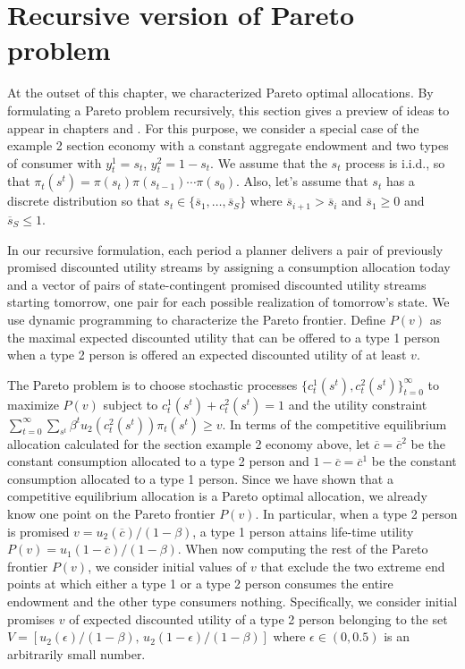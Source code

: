 \section{Recursive version of Pareto problem}\label{sec:RecursivePareto}%
At the  outset of this chapter, we characterized Pareto
optimal allocations. By formulating a Pareto problem  recursively, this section
gives a preview of ideas to appear in chapters 
and .
For this purpose, we
consider a special case of the example 2 section   
economy with a constant aggregate
endowment and two types of consumer with $y_t^1 = s_t$, $y_t^2 = 1-s_t$.
We  assume that the $s_t$ process
is i.i.d., so that $\pi_t(s^t) = \pi(s_t)
\pi(s_{t-1}) \cdots \pi(s_0)$.   Also, let's assume
that $s_t$ has a discrete distribution
so that
$s_t \in \{\overline s_1, \ldots, \overline s_S\} $
where $\overline s_{i+1} > \overline s_i$ and $\overline s_1 \geq 0$
and $\overline s_S \leq 1$.


In our recursive formulation, each period a planner
delivers a pair of previously promised discounted
utility streams by assigning a consumption
allocation today and a vector of pairs of state-contingent
promised discounted utility streams starting tomorrow,
one pair for each possible realization of tomorrow's state.
We use dynamic programming to characterize the Pareto
frontier. Define $P(v)$ as the maximal expected discounted
utility that can be offered to a type 1 person when 
a type 2 person is offered an expected discounted
utility of at least $v$. 

The Pareto problem is to choose stochastic processes $\{c_t^1(s^t), c_t^2(s^t)\}_{t=0}^\infty$ to
 maximize
$P(v)$ subject to  $c_t^1(s^t) + c_t^2(s^t) =1$ and the utility constraint
$\sum_{t=0}^\infty \sum_{s^t} \beta^t u_2(c_t^2(s^t)) \pi_t(s^t) \geq v.$
In terms of the competitive equilibrium
allocation calculated for  the section  example 2  economy above,
let $\overline c= \overline c^2$ be the  constant consumption
allocated to a type 2 person and $1-\overline
c=\overline c^1$ be the constant consumption
allocated to a type 1 person.
Since we have shown that a competitive equilibrium allocation is
a Pareto optimal allocation, we already know one point on the
Pareto frontier $P(v)$. In particular, when a type 2 person is promised
$v= u_2(\overline c) / (1 - \beta) $, a type 1 person attains
life-time utility
$P(v) =  u_1(1-\overline c) / (1-\beta)$. 
When now computing the rest of the Pareto frontier $P(v)$, 
we consider initial values of $v$ that exclude the two
extreme end points at which either a type 1 or a type 2 person 
consumes the entire endowment and the other type consumers nothing.
 Specifically, we consider initial promises $v$ 
of expected discounted utility of a type 2 person 
belonging to the set
$V = [u_2(\epsilon) / (1-\beta),\,  
      u_2(1-\epsilon) / (1 -\beta)]$ 
where $\epsilon\in(0,0.5)$ is an arbitrarily small number.





